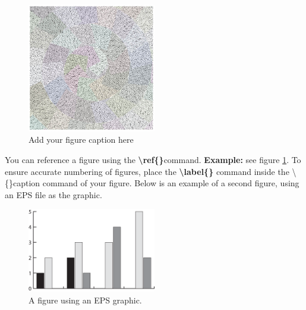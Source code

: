 \documentclass[hasAbstract,authorBox]{csmagazine}
\begin{document}

\begin{figure}[H]
	\begin{center}	
		\includegraphics[width=0.5\textwidth]{figure_1.jpg}
		\caption{Add your figure caption here \label{fig:example_fig}}		
	\end{center}
\end{figure}

You can reference a figure using the \textbf{\textbackslash{}ref\{\}}command. \textbf{Example:} see figure \ref{fig:example_fig}. To ensure accurate numbering of figures, place the \textbf{\textbackslash{}label\{\}} command inside the \textbackslash{}\{\}caption command of your figure. Below is an example of a second figure, using an EPS file as the graphic.

\begin{figure}[H]
	\begin{center}	
		\includegraphics[width=0.5\textwidth]{figure_2.eps}
		\caption{A figure using an EPS graphic. \label{fig:example_fig2}}		
	\end{center}
\end{figure}
\end{document}
